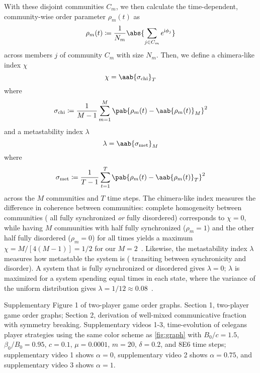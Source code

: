 \documentclass[pdflatex,twocolumn,sn-nature,super]{sn-jnl}
\begin{document}
With these disjoint communities $C_m$, we then calculate
the time-dependent, community-wise order parameter $\rho_m(t)$
as
\begin{equation}
  \rho_m(t) \coloneqq \frac{1}{N_m} \abs{\sum_{j \in C_m} e^{\im \phi_j}}
\end{equation}
across members $j$ of community $C_m$ with size $N_m$.
Then, we define a chimera-like index $\chi$
\begin{equation}
  \chi = \aab{
    \sigma_{\text{chi}}}_T
  \label{eq:chimera_index}
\end{equation}
where
\begin{equation*}
    \sigma_{\text{chi}} \coloneqq \frac{1}{M-1} \sum_{m=1}^M
    \pab{\rho_m(t) - \aab{\rho_m(t)}_M}^2
\end{equation*}
and a metastability index $\lambda$
\begin{equation}
  \lambda = \aab{
    \sigma_{\text{met}}}_M
  \label{eq:metastability_index}
\end{equation}
where
\begin{equation*}
    \sigma_{\text{met}} \coloneqq \frac{1}{T-1} \sum_{t=1}^T
    \pab{\rho_m(t) - \aab{\rho_m(t)}_T}^2
\end{equation*}
across the $M$ communities and $T$ time steps.
The chimera-like index measures the difference in coherence between communities:
complete homogeneity between communities
(\eg{} all fully synchronized \emph{or} fully disordered)
corresponds to $\chi = 0$,
while having $M$ communities
with half fully synchronized ($\rho_m = 1$)
and the other half fully disordered ($\rho_m = 0$)
for all times yields a maximum $\chi = M/[4(M-1)]
= 1/2$ for our $M=2$~\citep{shanahan2010metastable}.
Likewise, the metastability index $\lambda$ measures how metastable
the system is (\ie{} transiting between synchronicity and disorder).
A system that is fully synchronized or disordered gives $\lambda = 0$;
$\lambda$ is maximized for a system spending equal times in each state,
where the variance of the uniform distribution gives
$\lambda = 1/12 \approx \num{0.08}$~\citep{shanahan2010metastable}.

\backmatter{}

Supplementary Figure 1 of two-player game order graphs.
Section 1, two-player game order graphs;
Section 2, derivation of well-mixed communicative fraction
with symmetry breaking.
Supplementary videos 1-3,
time-evolution of \gls{celegans} player strategies
using the same color scheme as \cref{fig:graph}
with $B_0/c = 1.5$, $\beta_0/B_0 = 0.95$, $c = 0.1$,
$\mu = 0.0001$, $m = 20$, $\delta = 0.2$, and \num{8E6} time steps;
supplementary video 1 shows $\alpha = 0$,
supplementary video 2 shows $\alpha = 0.75$,
and
supplementary video 3 shows $\alpha = 1$.
\end{document}
